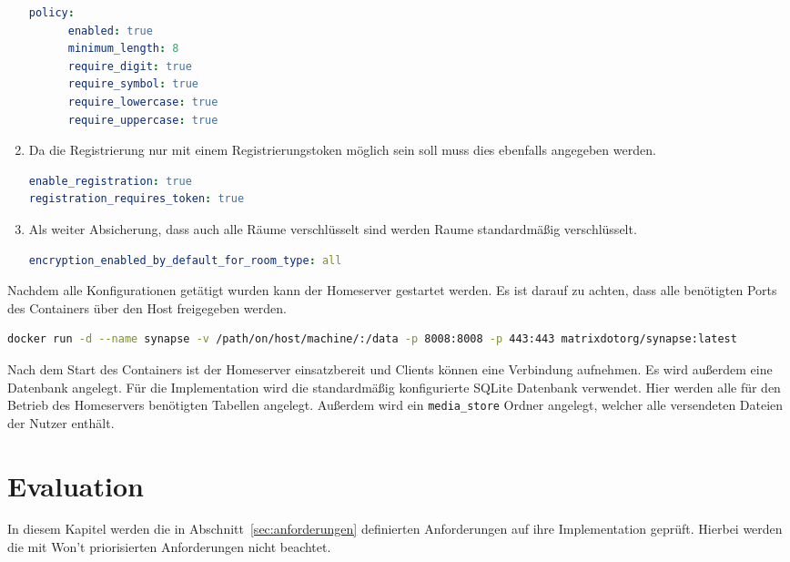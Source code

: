 \begin{enumerate}[label={(\arabic*)}]
\begin{lstlisting}[language=yaml,label={lst:password-policy}]
   policy:
      enabled: true
      minimum_length: 8
      require_digit: true
      require_symbol: true
      require_lowercase: true
      require_uppercase: true
            \end{lstlisting}
        \item Da die Registrierung nur mit einem Registrierungstoken möglich sein soll muss dies ebenfalls angegeben werden.
        \begin{lstlisting}[language=yaml,label={lst:enable-registration}]
enable_registration: true
registration_requires_token: true
        \end{lstlisting}
        \item Als weiter Absicherung, dass auch alle Räume verschlüsselt sind werden Raume standardmäßig verschlüsselt.
    \begin{lstlisting}[language=yaml,label={lst:enable-encryption}]
encryption_enabled_by_default_for_room_type: all
    \end{lstlisting}
    \end{enumerate}

    Nachdem alle Konfigurationen getätigt wurden kann der Homeserver gestartet werden.
    Es ist darauf zu achten, dass alle benötigten Ports des Containers über den Host freigegeben werden.

    \begin{lstlisting}[language=bash,label={lst:synapse-start}]
docker run -d --name synapse -v /path/on/host/machine/:/data -p 8008:8008 -p 443:443 matrixdotorg/synapse:latest
    \end{lstlisting}

    Nach dem Start des Containers ist der Homeserver einsatzbereit und Clients können eine Verbindung aufnehmen.
    Es wird außerdem eine Datenbank angelegt.
    Für die Implementation wird die standardmäßig konfigurierte SQLite Datenbank verwendet.
    Hier werden alle für den Betrieb des Homeservers benötigten Tabellen angelegt.
    Außerdem wird ein \texttt{media\_store} Ordner angelegt, welcher alle versendeten Dateien der Nutzer enthält.

    \newpage
    \chapter{Evaluation}\label{ch:evaluation}
    In diesem Kapitel werden die in Abschnitt~\ref{sec:anforderungen} definierten Anforderungen auf ihre Implementation geprüft.
    Hierbei werden die mit Won't priorisierten Anforderungen nicht beachtet.

